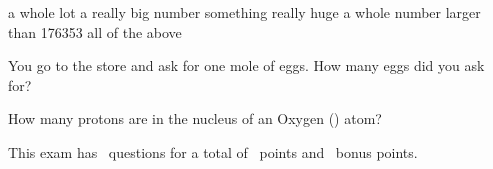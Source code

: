 \documentclass[11pt,addpoints]{exam}   	%
\begin{document}
\begin{questions}
\begin{choices}
\choice a whole lot
\choice a really big number
\choice something really huge
\choice a whole number larger than 176353
\choice all of the above
\end{choices}

\question[1]
You go to the store and ask for one mole of eggs. How many eggs did you ask for?

\question[1] 
How many protons are in the nucleus of an Oxygen () atom?


\end{questions}

\vspace{2in}

\begin{center}
This exam has \numquestions\ questions for a total of \numpoints\ points and \numbonuspoints\ bonus points.
\end{center}

\begin{center}
\gradetable[v][questions]
\end{center}
\end{document}
